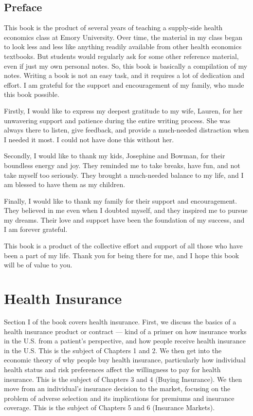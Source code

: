 \documentclass[
  letterpaper,
  DIV=11,
  numbers=noendperiod]{scrreport}
\theoremstyle{definition}
\theoremstyle{remark}
\begin{document}


\hypertarget{preface}{%
\chapter*{Preface}\label{preface}}


This book is the product of several years of teaching a supply-side
health economics class at Emory University. Over time, the material in
my class began to look less and less like anything readily available
from other health economics textbooks. But students would regularly ask
for some other reference material, even if just my own personal notes.
So, this book is basically a compilation of my notes. Writing a book is
not an easy task, and it requires a lot of dedication and effort. I am
grateful for the support and encouragement of my family, who made this
book possible.

Firstly, I would like to express my deepest gratitude to my wife,
Lauren, for her unwavering support and patience during the entire
writing process. She was always there to listen, give feedback, and
provide a much-needed distraction when I needed it most. I could not
have done this without her.

Secondly, I would like to thank my kids, Josephine and Bowman, for their
boundless energy and joy. They reminded me to take breaks, have fun, and
not take myself too seriously. They brought a much-needed balance to my
life, and I am blessed to have them as my children.

Finally, I would like to thank my family for their support and
encouragement. They believed in me even when I doubted myself, and they
inspired me to pursue my dreams. Their love and support have been the
foundation of my success, and I am forever grateful.

This book is a product of the collective effort and support of all those
who have been a part of my life. Thank you for being there for me, and I
hope this book will be of value to you.

\part{Health Insurance}

Section I of the book covers health insurance. First, we discuss the
basics of a health insurance product or contract --- kind of a primer on
how insurance works in the U.S. from a patient's perspective, and how
people receive health insurance in the U.S. This is the subject of
Chapters 1 and 2. We then get into the economic theory of why people buy
health insurance, particularly how individual health status and risk
preferences affect the willingness to pay for health insurance. This is
the subject of Chapters 3 and 4 (Buying Insurance). We then move from an
individual's insurance decision to the market, focusing on the problem
of adverse selection and its implications for premiums and insurance
coverage. This is the subject of Chapters 5 and 6 (Insurance Markets).
\end{document}
